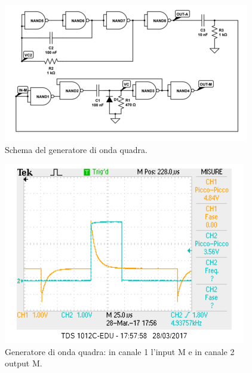 \documentclass[10pt,a4paper]{article}
\begin{document}








\begin{figure}[!htb]
  \centering
  \includegraphics[scale=0.9]{generatorequadra.png}
\caption{Schema del generatore di onda quadra.\label{fig:generatorequadra}}
\end{figure}

\begin{figure}[!htb]
  \centering
  \includegraphics[scale=0.75]{generatore1inm2outm.png}
\caption{Generatore di onda quadra: in canale 1 l'input M e in canale 2 output M.\label{osc:generatorequadra}}
\end{figure}
\end{document}
